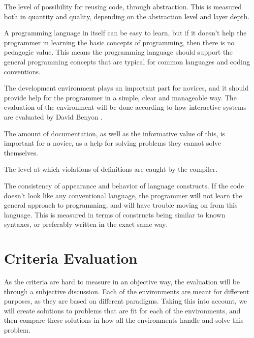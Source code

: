 \begin{description}[style=nextline]
\item[Reusability] The level of possibility for reusing code, through abstraction. This is measured both in quantity and quality, depending on the abstraction level and layer depth.
\item[Pedagogic Value] A programming language in itself can be easy to learn, but if it doesn't help the programmer in learning the basic concepts of programming, then there is no pedagogic value. This means the programming language should support the general programming concepts that are typical for common languages and coding conventions.
\item[Environment] The development environment plays an important part for novices, and it should provide help for the programmer in a simple, clear and manageable way. The evaluation of the environment will be done according to how interactive systems are evaluated by David Benyon \cite[p. 225-250]{design_book}.
\item[Documentation] The amount of documentation, as well as the informative value of this, is important for a novice, as a help for solving problems they cannot solve themselves.
\item[Security] The level at which violations of definitions are caught by the compiler. 
\item[Uniformity] The consistency of appearance and behavior of language constructs. If the code doesn't look like any conventional language, the programmer will not learn the general approach to programming, and will have trouble moving on from this language. This is measured in terms of constructs being similar to known syntaxes, or preferably written in the exact same way.
\end{description}


\section{Criteria Evaluation}
As the criteria are hard to measure in an objective way, the evaluation will be through a subjective discussion. Each of the environments are meant for different purposes, as they are based on different paradigms. Taking this into account, we will create solutions to problems that are fit for each of the environments, and then compare these solutions in how all the environments handle and solve this problem.
